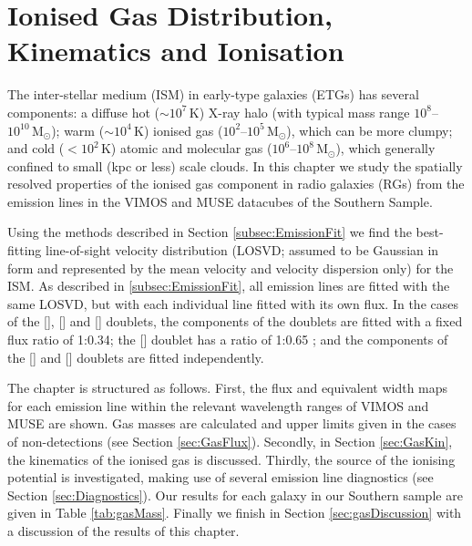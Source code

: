 \chapter{Ionised Gas Distribution, Kinematics and Ionisation}
	\label{cha:gas}
The inter-stellar medium (ISM) in early-type galaxies (ETGs) has several components: a diffuse hot ($\sim 10^7 \, \mathrm{K}$) X-ray halo (with typical mass range $10^8$--$10^{10} \, \mathrm{M_\odot}$); warm ($\sim 10^4 \, \mathrm{K}$) ionised gas ($10^2$--$10^5 \, \mathrm{M_\odot}$), which can be more clumpy; and cold ($<10^2 \, \mathrm{K}$) atomic and molecular gas ($10^6$--$10^8 \, \mathrm{M_\odot}$), which generally confined to small (kpc or less) scale clouds. In this chapter we study the spatially resolved properties of the ionised gas component in radio galaxies (RGs) from the emission lines in the VIMOS and MUSE datacubes of the Southern Sample.

Using the methods described in Section \ref{subsec:EmissionFit} we find the best-fitting line-of-sight velocity distribution (LOSVD; assumed to be Gaussian in form and represented by the mean velocity and velocity dispersion only) for the ISM. As described in \ref{subsec:EmissionFit}, all emission lines are fitted with the same LOSVD, but with each individual line fitted with its own flux. In the cases of the [], [] and [] doublets, the components of the doublets are fitted with a fixed flux ratio of 1:0.34; the [] doublet has a ratio of 1:0.65 \citep{Safier1992}; and the components of the [] and [] doublets are fitted independently.

The chapter is structured as follows. First, the flux and equivalent width maps for each emission line within the relevant wavelength ranges of VIMOS and MUSE are shown. Gas masses are calculated and upper limits given in the cases of non-detections (see Section \ref{sec:GasFlux}). Secondly, in Section \ref{sec:GasKin}, the kinematics of the ionised gas is discussed. Thirdly, the source of the ionising potential is investigated, making use of several emission line diagnostics (see Section \ref{sec:Diagnostics}). Our results for each galaxy in our Southern sample are given in Table \ref{tab:gasMass}. Finally we finish in Section \ref{sec:gasDiscussion} with a discussion of the results of this chapter.


